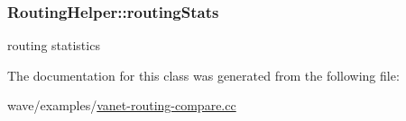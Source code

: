 \subsubsection[{\texorpdfstring{routing\+Stats}{routingStats}}]{ Routing\+Helper\+::routing\+Stats\hspace{0.3cm}{\ttfamily [private]}}\hypertarget{classRoutingHelper_ab41a23ccfe8daaad29b2a00ed8a78d11}{}\label{classRoutingHelper_ab41a23ccfe8daaad29b2a00ed8a78d11}


routing statistics 



The documentation for this class was generated from the following file\+:\begin{DoxyCompactItemize}
\item 
wave/examples/\hyperlink{vanet-routing-compare_8cc}{vanet-\/routing-\/compare.\+cc}\end{DoxyCompactItemize}
